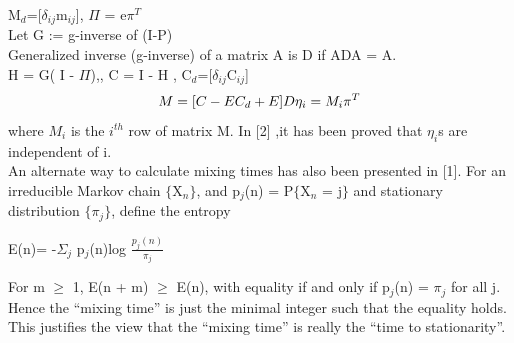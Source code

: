 \documentclass[12pt]{article}
\begin{document}
\begin{itemize}
M$_{d}$=[$\delta_{ij}$m$_{ij}$], \hspace{2pt}
$\Pi$ = e$\pi^{T}$ \\
Let G := g-inverse of (I-P) \\
Generalized inverse (g-inverse) of a matrix A is D if ADA = A. \\
H = G( I - $\Pi$),\hspace{2pt}, C = I - H ,\hspace{2pt} C$_{d}$=[$\delta_{ij}$C$_{ij}$]
\begin{equation}
M = [ C - EC_{d} + E ]D\\
\eta_{i} = M_{i} \pi^{T}
\end{equation}
where $M_{i}$ is the $i^{th}$ row of matrix M.
In [2] ,it has been proved that $\eta_{i}$s are independent of i.\\
An alternate way to calculate mixing times has also been presented in [1].
For an irreducible Markov chain $\lbrace$X$_{n}\rbrace$, and p$_{j}$(n) = 
P$\lbrace$X$_{n}$ = j$\rbrace$ and
stationary distribution $\lbrace\pi_{j}\rbrace$, define the entropy
\begin{center}
E(n)= -$\Sigma_{j}$ p$_{j}$(n)log $\frac{p_{j}(n)}{\pi_{j}}$
\end{center}
For m $\geq$ 1, E(n + m) $\geq$ E(n), with equality if and only if p$_{j}$(n) = $\pi_{j}$ for all
j. Hence the “mixing time” is just the minimal integer such that the equality holds. This justifies
the view that the “mixing time” is really the “time to stationarity”.
\end{itemize}
\end{document}
